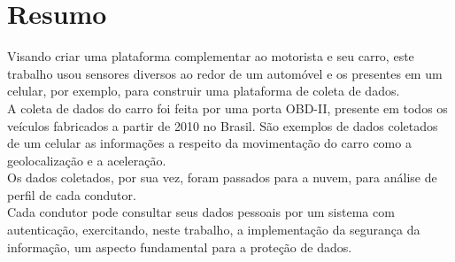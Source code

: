 \chapter*{Resumo}

\noindent Visando criar uma plataforma complementar ao motorista e seu carro, este trabalho usou sensores diversos ao redor de um automóvel e os presentes em um celular, por exemplo, para construir uma plataforma de coleta de dados.\\
A coleta de dados do carro foi feita por uma porta OBD-II, presente em todos os veículos fabricados a partir de 2010 no Brasil. São exemplos de dados coletados de um celular as informações a respeito da movimentação do carro como a geolocalização e a aceleração.\\ 
Os dados coletados, por sua vez, foram passados para a nuvem, para análise de perfil de cada condutor.\\ 
Cada condutor pode consultar seus dados pessoais por um sistema com autenticação, exercitando, neste trabalho, a implementação da segurança da informação, um aspecto fundamental para a proteção de dados.
